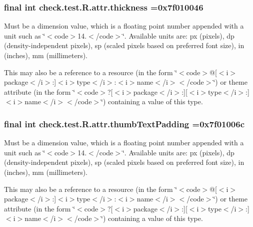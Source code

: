 \subsubsection[{thickness}]{\setlength{\rightskip}{0pt plus 5cm}final int check.\+test.\+R.\+attr.\+thickness =0x7f010046\hspace{0.3cm}{\ttfamily [static]}}\label{classcheck_1_1test_1_1_r_1_1attr_a124aa9eea72db03186b6295aebdcfec8}
Must be a dimension value, which is a floating point number appended with a unit such as \char`\"{}$<$code$>$14.\+5sp$<$/code$>$\char`\"{}. Available units are\+: px (pixels), dp (density-\/independent pixels), sp (scaled pixels based on preferred font size), in (inches), mm (millimeters). 

This may also be a reference to a resource (in the form \char`\"{}$<$code$>$@\mbox{[}$<$i$>$package$<$/i$>$\+:\mbox{]}$<$i$>$type$<$/i$>$\+:$<$i$>$name$<$/i$>$$<$/code$>$\char`\"{}) or theme attribute (in the form \char`\"{}$<$code$>$?\mbox{[}$<$i$>$package$<$/i$>$\+:\mbox{]}\mbox{[}$<$i$>$type$<$/i$>$\+:\mbox{]}$<$i$>$name$<$/i$>$$<$/code$>$\char`\"{}) containing a value of this type. \hypertarget{classcheck_1_1test_1_1_r_1_1attr_a8e826d9b4743add8c93af83988130b52}{}
\subsubsection[{thumb\+Text\+Padding}]{\setlength{\rightskip}{0pt plus 5cm}final int check.\+test.\+R.\+attr.\+thumb\+Text\+Padding =0x7f01006c\hspace{0.3cm}{\ttfamily [static]}}\label{classcheck_1_1test_1_1_r_1_1attr_a8e826d9b4743add8c93af83988130b52}
Must be a dimension value, which is a floating point number appended with a unit such as \char`\"{}$<$code$>$14.\+5sp$<$/code$>$\char`\"{}. Available units are\+: px (pixels), dp (density-\/independent pixels), sp (scaled pixels based on preferred font size), in (inches), mm (millimeters). 

This may also be a reference to a resource (in the form \char`\"{}$<$code$>$@\mbox{[}$<$i$>$package$<$/i$>$\+:\mbox{]}$<$i$>$type$<$/i$>$\+:$<$i$>$name$<$/i$>$$<$/code$>$\char`\"{}) or theme attribute (in the form \char`\"{}$<$code$>$?\mbox{[}$<$i$>$package$<$/i$>$\+:\mbox{]}\mbox{[}$<$i$>$type$<$/i$>$\+:\mbox{]}$<$i$>$name$<$/i$>$$<$/code$>$\char`\"{}) containing a value of this type. \hypertarget{classcheck_1_1test_1_1_r_1_1attr_a002c5907c5484ce9f870aa21ac099f9b}{}
